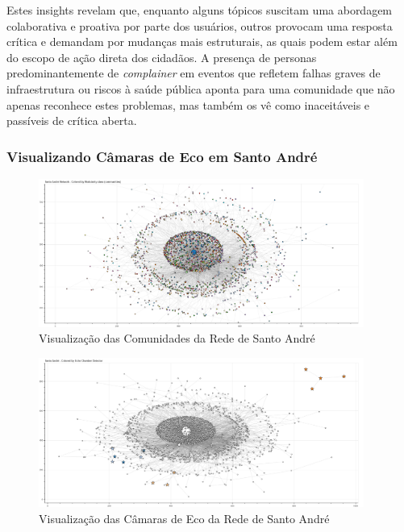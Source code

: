 Estes insights revelam que, enquanto alguns tópicos suscitam uma abordagem colaborativa e proativa por parte dos usuários, outros provocam uma resposta crítica e demandam por mudanças mais estruturais, as quais podem estar além do escopo de ação direta dos cidadãos. A presença de personas predominantemente de \textit{complainer} em eventos que refletem falhas graves de infraestrutura ou riscos à saúde pública aponta para uma comunidade que não apenas reconhece estes problemas, mas também os vê como inaceitáveis e passíveis de crítica aberta.

\subsubsection*{Visualizando Câmaras de Eco em Santo André}

\begin{figure}[htb]
	\centering
	\includegraphics[width=0.95\textwidth]{images/network_community_santo_andre.png}
	\caption{Visualização das Comunidades da Rede de Santo André}
	\label{fig:network_community_santo_andre}
\end{figure}

\begin{figure}[htb]
	\centering
	\includegraphics[width=0.95\textwidth]{images/echo_chambers_santo_andre.png}
	\caption{Visualização das Câmaras de Eco da Rede de Santo André}
	\label{fig:echo_chambers_santo_andre}
\end{figure}

